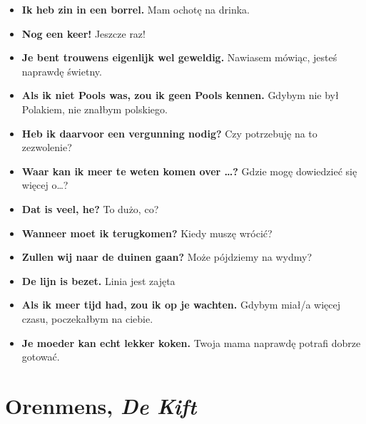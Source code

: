 \documentclass[
]{book}
\providecommand{\tightlist}{%
  \setlength{\itemsep}{0pt}\setlength{\parskip}{0pt}}
\begin{document}
\begin{itemize}
\tightlist
\item
  \textbf{Ik heb zin in een borrel.} Mam ochotę na drinka.\\
\item
  \textbf{Nog een keer!} Jeszcze raz!\\
\item
  \textbf{Je bent trouwens eigenlijk wel geweldig.} Nawiasem mówiąc, jesteś naprawdę świetny.\\
\item
  \textbf{Als ik niet Pools was, zou ik geen Pools kennen.} Gdybym nie był Polakiem, nie znałbym polskiego.\\
\item
  \textbf{Heb ik daarvoor een vergunning nodig?} Czy potrzebuję na to zezwolenie?\\
\item
  \textbf{Waar kan ik meer te weten komen over \ldots?} Gdzie mogę dowiedzieć się więcej o\ldots?\\
\item
  \textbf{Dat is veel, he?} To dużo, co?\\
\item
  \textbf{Wanneer moet ik terugkomen?} Kiedy muszę wrócić?\\
\item
  \textbf{Zullen wij naar de duinen gaan?} Może pójdziemy na wydmy?\\
\item
  \textbf{De lijn is bezet.} Linia jest zajęta\\
\item
  \textbf{Als ik meer tijd had, zou ik op je wachten.} Gdybym miał/a więcej czasu, poczekałbym na ciebie.\\
\item
  \textbf{Je moeder kan echt lekker koken.} Twoja mama naprawdę potrafi dobrze gotować.
\end{itemize}

\hypertarget{Orenmens}{%
\section{\texorpdfstring{Orenmens, \emph{De Kift}}{Orenmens, De Kift}}\label{Orenmens}}
\end{document}
